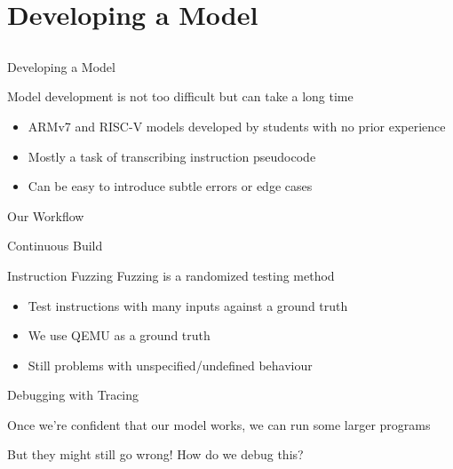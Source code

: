 \section{Developing a Model}
\subsection{}

\begin{frame}{Developing a Model}

Model development is not too difficult but can take a long time

\begin{itemize}
\item ARMv7 and RISC-V models developed by students with no prior experience
\item Mostly a task of transcribing instruction pseudocode
\item Can be easy to introduce subtle errors or edge cases
\end{itemize}

\end{frame}

\begin{frame}{Our Workflow}
\end{frame}

\begin{frame}{Continuous Build}


\end{frame}

\begin{frame}{Instruction Fuzzing}
Fuzzing is a randomized testing method

\begin{itemize}
\item<2-> Test instructions with many inputs against a ground truth
\item<3-> We use QEMU as a ground truth
\item<4-> \alert{Still problems with unspecified/undefined behaviour}
\end{itemize}



\end{frame}

\begin{frame}{Debugging with Tracing}

Once we're confident that our model works, we can run some larger programs

\pause

But they might still go wrong! How do we debug this?

\end{frame}

